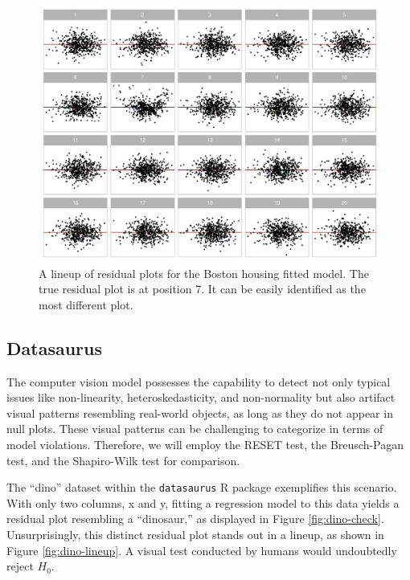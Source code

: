 \documentclass[]{interact}
\theoremstyle{plain}%
\theoremstyle{definition}
\theoremstyle{remark}
\begin{document}
\begin{figure}[!h]

{\centering \includegraphics[width=1\linewidth]{paper_files/figure-latex/boston-lineup-1} 

}

\caption{A lineup of residual plots for the Boston housing fitted model. The true residual plot is at position 7. It can be easily identified as the most different plot.}\label{fig:boston-lineup}
\end{figure}

\subsection{Datasaurus}\label{datasaurus}

The computer vision model possesses the capability to detect not only
typical issues like non-linearity, heteroskedasticity, and non-normality
but also artifact visual patterns resembling real-world objects, as long
as they do not appear in null plots. These visual patterns can be
challenging to categorize in terms of model violations. Therefore, we
will employ the RESET test, the Breusch-Pagan test, and the Shapiro-Wilk
test \citep{shapiro1965analysis} for comparison.

The ``dino'' dataset within the \texttt{datasaurus} R package
exemplifies this scenario. With only two columns, x and y, fitting a
regression model to this data yields a residual plot resembling a
``dinosaur,'' as displayed in Figure \ref{fig:dino-check}.
Unsurprisingly, this distinct residual plot stands out in a lineup, as
shown in Figure \ref{fig:dino-lineup}. A visual test conducted by humans
would undoubtedly reject \(H_0\).
\end{document}
